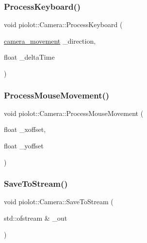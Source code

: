 \subsubsection{\texorpdfstring{Process\+Keyboard()}{ProcessKeyboard()}}
{\footnotesize\ttfamily void piolot\+::\+Camera\+::\+Process\+Keyboard (\begin{DoxyParamCaption}\item[{\mbox{\hyperlink{classpiolot_1_1_camera_afba5e0e4539ee7666e8354842c4988e0}{camera\+\_\+movement}}}]{\+\_\+direction,  }\item[{float}]{\+\_\+delta\+Time }\end{DoxyParamCaption})}

\mbox{\label{classpiolot_1_1_camera_ae6e18ad2ee8ca787ffe5fa35a01dd16b}} 
\subsubsection{\texorpdfstring{Process\+Mouse\+Movement()}{ProcessMouseMovement()}}
{\footnotesize\ttfamily void piolot\+::\+Camera\+::\+Process\+Mouse\+Movement (\begin{DoxyParamCaption}\item[{float}]{\+\_\+xoffset,  }\item[{float}]{\+\_\+yoffset }\end{DoxyParamCaption})}

\mbox{\label{classpiolot_1_1_camera_abd25ede2299da256764a59e991a8e25a}} 
\subsubsection{\texorpdfstring{Save\+To\+Stream()}{SaveToStream()}}
{\footnotesize\ttfamily void piolot\+::\+Camera\+::\+Save\+To\+Stream (\begin{DoxyParamCaption}\item[{std\+::ofstream \&}]{\+\_\+out }\end{DoxyParamCaption})}

\mbox{\label{classpiolot_1_1_camera_a6151125f42016135376a60182acb63ef}} 
